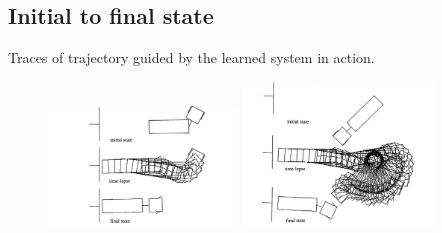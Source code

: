 \subsection{Initial to final state}
Traces of trajectory guided by the learned system in action.
\begin{figure}[H]
    \centering
    \includegraphics[width=0.45\textwidth]{labs/13/images/state.png}
    \label{fig:state}
    \includegraphics[width=0.45\textwidth]{labs/13/images/state2.png}
    \label{fig:state2}
\end{figure}